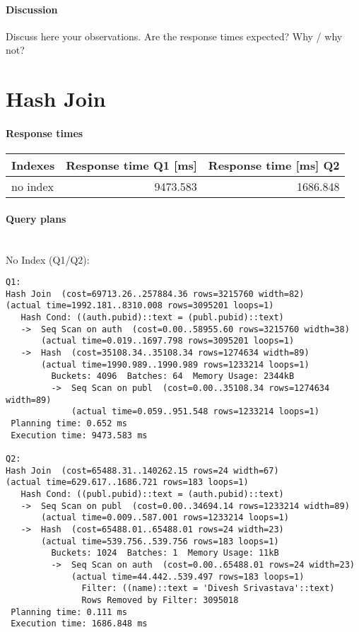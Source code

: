 \documentclass[11pt]{scrartcl}
\begin{document}
\paragraph{Discussion}
Discuss here your observations. Are the response times expected? Why
/ why not? 

\section{Hash Join}

\paragraph{Response times}

\begin{flushleft}
\begin{tabular}{l|r|r}
  Indexes & Response time Q1 [ms] & Response time [ms] Q2 \\
  \hline
  no index & 9473.583 & 1686.848 \\
\end{tabular}
\end{flushleft}

\paragraph{Query plans}\mbox{}\\ 

\noindent No Index (Q1/Q2):
{\small
\begin{verbatim}
Q1:
Hash Join  (cost=69713.26..257884.36 rows=3215760 width=82)
(actual time=1992.181..8310.008 rows=3095201 loops=1)
   Hash Cond: ((auth.pubid)::text = (publ.pubid)::text)
   ->  Seq Scan on auth  (cost=0.00..58955.60 rows=3215760 width=38)
       (actual time=0.019..1697.798 rows=3095201 loops=1)
   ->  Hash  (cost=35108.34..35108.34 rows=1274634 width=89)
       (actual time=1990.989..1990.989 rows=1233214 loops=1)
         Buckets: 4096  Batches: 64  Memory Usage: 2344kB
         ->  Seq Scan on publ  (cost=0.00..35108.34 rows=1274634 width=89)
             (actual time=0.059..951.548 rows=1233214 loops=1)
 Planning time: 0.652 ms
 Execution time: 9473.583 ms

Q2:
Hash Join  (cost=65488.31..140262.15 rows=24 width=67)
(actual time=629.617..1686.721 rows=183 loops=1)
   Hash Cond: ((publ.pubid)::text = (auth.pubid)::text)
   ->  Seq Scan on publ  (cost=0.00..34694.14 rows=1233214 width=89)
       (actual time=0.009..587.001 rows=1233214 loops=1)
   ->  Hash  (cost=65488.01..65488.01 rows=24 width=23)
       (actual time=539.756..539.756 rows=183 loops=1)
         Buckets: 1024  Batches: 1  Memory Usage: 11kB
         ->  Seq Scan on auth  (cost=0.00..65488.01 rows=24 width=23)
             (actual time=44.442..539.497 rows=183 loops=1)
               Filter: ((name)::text = 'Divesh Srivastava'::text)
               Rows Removed by Filter: 3095018
 Planning time: 0.111 ms
 Execution time: 1686.848 ms
\end{verbatim}
}
\end{document}
